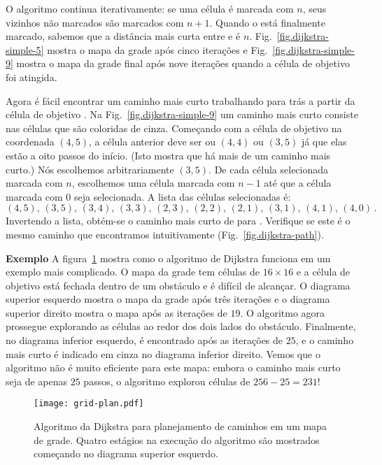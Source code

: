 O algoritmo continua iterativamente: se uma célula é marcada com $n$, seus vizinhos não marcados são marcados com $n+1$. Quando o  está finalmente marcado, sabemos que a distância mais curta entre  e  é $n$. Fig.~\ref{fig.dijkstra-simple-5} mostra o mapa da grade após cinco iterações e Fig.~\ref{fig.dijkstra-simple-9} mostra o mapa da grade final após nove iterações quando a célula de objetivo foi atingida.

Agora é fácil encontrar um caminho mais curto trabalhando para trás a partir da célula de objetivo . Na Fig.~\ref{fig.dijkstra-simple-9} um caminho mais curto consiste nas células que são coloridas de cinza. Começando com a célula de objetivo na coordenada $(4,5)$, a célula anterior deve ser ou $(4,4)$ ou $(3,5)$ já que elas estão a oito passos do início. (Isto mostra que há mais de um caminho mais curto.) Nós escolhemos arbitrariamente $(3,5)$. De cada célula selecionada marcada com $n$, escolhemos uma célula marcada com $n-1$ até que a célula  marcada com $0$ seja selecionada. A lista das células selecionadas é:
\[
(4,5),\, (3,5),\, (3,4),\, (3,3),\, (2,3),\, (2,2),\, (2,1),\, (3,1),\, (4,1),\, (4,0)\,.
\]
Invertendo a lista, obtém-se o caminho mais curto de  para . Verifique se este é o mesmo caminho que encontramos intuitivamente (Fig.~\ref{fig.dijkstra-path}).

\smallskip

\noindent\textbf{Exemplo} A figura~\ref{fig.dijkstra} mostra como o algoritmo de Dijkstra funciona em um exemplo mais complicado. O mapa da grade tem células de $16\times 16$ e a célula de objetivo  está fechada dentro de um obstáculo e é difícil de alcançar. O diagrama superior esquerdo mostra o mapa da grade após três iterações e o diagrama superior direito mostra o mapa após as iterações de $19$. O algoritmo agora prossegue explorando as células ao redor dos dois lados do obstáculo. Finalmente, no diagrama inferior esquerdo,  é encontrado após as iterações de $25$, e o caminho mais curto é indicado em cinza no diagrama inferior direito. Vemos que o algoritmo não é muito eficiente para este mapa: embora o caminho mais curto seja de apenas $25$ passos, o algoritmo explorou células de $256-25=231$!

\begin{figure}
\begin{center}
\texttt{[image: grid-plan.pdf]}
\end{center}
\caption{Algoritmo da Dijkstra para planejamento de caminhos em um mapa de grade. Quatro estágios na execução do algoritmo são mostrados começando no diagrama superior esquerdo.}\label{fig.dijkstra}
\end{figure}

